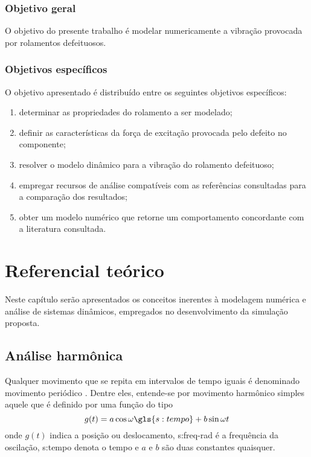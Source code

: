\documentclass[12pt,oneside,english,brazil,lmodern,siglas,simbolos,cite=num]{ucsmonograph}
\begin{document}
	\subsection{Objetivo geral}
	O objetivo do presente trabalho é modelar numericamente a vibração provocada por rolamentos defeituosos.
	
	\subsection{Objetivos específicos} \label{sec:objetivos:especificos}
	O objetivo apresentado é distribuído entre os seguintes objetivos específicos:
	\begin{enumerate}
		\item determinar as propriedades do rolamento a ser modelado;
		\item definir as características da força de excitação provocada pelo defeito no componente;
		\item resolver o modelo dinâmico para a vibração do rolamento defeituoso;
		\item empregar recursos de análise compatíveis com as referências consultadas para a comparação dos resultados;
		\item obter um modelo numérico que retorne um comportamento concordante com a literatura consultada.
	\end{enumerate}

	\chapter{Referencial teórico}
	Neste capítulo serão apresentados os conceitos inerentes à modelagem numérica e análise de sistemas dinâmicos, empregados no desenvolvimento da simulação proposta.
	
	\section{Análise harmônica}
	Qualquer movimento que se repita em intervalos de tempo iguais é denominado movimento periódico \cite{rao:2008}.
	Dentre eles, entende-se por movimento harmônico simples aquele que é definido por uma função do tipo \cite{timoshenko:1974}
	\begin{equation}
		g(t) = a\cos\omega \gls{s:tempo} + b\sin\omega t
	\end{equation}
	onde $g(t)$ indica a posição ou deslocamento, \gls{s:freq-rad} é a frequência da oscilação, \gls{s:tempo} denota o tempo e $ a $ e $ b $ são duas constantes quaisquer.
	
\end{document}
